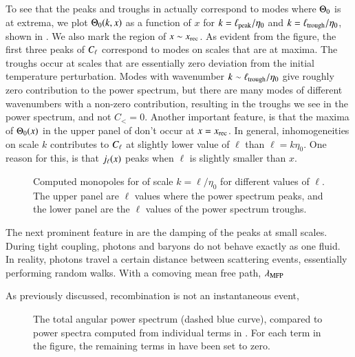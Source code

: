 To see that the peaks and troughs in  actually correspond to modes where $\Theta_0$ is at extrema, we plot $\Theta_0(k,x)$ as a function of $x$ for $k=\ell_\mathrm{peak}/\eta_0$ and $k=\ell_\mathrm{trough}/\eta_0$, shown in . We also mark the region of $x\sim x_\mathrm{rec}$.  As evident from the figure, the first three peaks of $C_\ell$ correspond to modes on scales that are at maxima. The troughs occur at scales that are essentially zero deviation from the initial temperature perturbation. Modes with wavenumber $k\sim\ell_\mathrm{trough}/\eta_0$ give roughly zero contribution to the power spectrum, but there are many modes of different wavenumbers with a non-zero contribution, resulting in the troughs we see in the power spectrum, and not $C_{\lt}=0$. Another important feature, is that the maxima of $\Theta_0(x)$ in the upper panel of  don't occur at $x=x_\mathrm{rec}$. In general, inhomogeneities on scale $k$ contributes to $C_\ell$ at slightly lower value of $\ell$ than $\ell=k\eta_0$. One reason for this, is that $j_\ell(x)$ peaks when $\ell$ is slightly smaller than $x$. 
\begin{figure}[ht!] 
    \caption{Computed monopoles for of scale $k=\ell/\eta_0$ for different values of $\ell$. The upper panel are $\ell$ values where the power spectrum peaks, and the lower panel are the $\ell$ values of the power spectrum troughs.}
    \label{fig:M4:results:theta0_at_peaks_and_troughs}
\end{figure}
The next prominent feature in  are the damping of the peaks at small scales. During tight coupling, photons and baryons do not behave exactly as one fluid. In reality, photons travel a certain distance between scattering events, essentially performing random walks. With a comoving mean free path, $\lambda_\mathrm{MFP}$   

As previously discussed, recombination is not an instantaneous event, 

\begin{figure}[ht!]
    \caption{The total angular power spectrum (dashed blue curve), compared to power spectra computed from individual terms in . For each term in the figure, the remaining terms in  have been set to zero.}
    \label{fig:M4:results:cells_components}
\end{figure}

